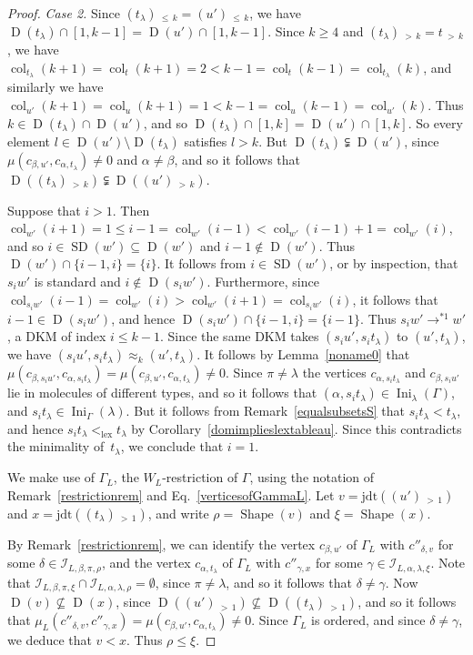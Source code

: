 \documentclass[ALCO,ThmDefs,Unicode,epreuves]{cedram}
\newenvironment{Case}[1]{\smallskip\noindent\emph{Case #1}\endgraf
 \nobreak\noindent\ignorespaces}{\endgraf\smallskip}
\DeclareMathOperator{\Ini}{Ini}
\DeclareMathOperator{\lex}{lex}
\DeclareMathOperator{\col}{col}
\newcommand{\morethan}[2]{#1\,{_{>\,#2}}}
\newcommand{\Lessthan}[2]{#1\,{_{\leqslant\,#2}}}
\newcommand{\jdt}{\mathrm{jdt}}
\DeclareMathOperator{\shape}{Shape}
\DeclareMathOperator{\SD}{SD}
\DeclareMathOperator{\D}{D}
\begin{document}
\begin{proof}
\begin{Case}{2. }
Since $\Lessthan {(t_\lambda)}{k}=\Lessthan {(u')}k$, we have
$\D(t_\lambda)\cap[1,k-1]=\D(u')\cap[1,k-1]$. Since $k\geqslant 4$ and
$\morethan{(t_\lambda)}k=\morethan tk$, we have
$\col_{t_\lambda}(k+1)=\col_t(k+1)=2<k-1=\col_t(k-1)=\col_{t_\lambda}(k)$, and similarly
we have $\col_{u'}(k+1)=\col_u(k+1)=1<k-1=\col_u(k-1)=\col_{u'}(k)$.
Thus $k\in\D(t_\lambda)\cap\D(u')$, and so
$\D(t_\lambda)\cap[1,k]=\D(u')\cap[1,k]$. So every element $l\in\D(u')\setminus\D(t_\lambda)$
satisfies $l>k$. But $\D(t_\lambda)\subsetneqq\D(u')$, since
$\mu(c_{\beta,u'},c_{\alpha,t_\lambda})\neq 0$ and $\alpha\ne\beta$, and so
it follows that
$\D(\morethan{(t_\lambda)}k)\subsetneqq\D(\morethan{(u')}k)$.

Suppose that $i>1$. Then
$\col_{w'}(i+1)=1\leqslant i-1=\col_{w'}(i-1)<\col_{w'}(i-1)+1=\col_{w'}(i)$,
and so $i\in\SD(w')\subseteq\D(w')$ and $i-1\notin\D(w')$. Thus
$\D(w')\cap\{i-1,i\}=\{i\}$. It follows from $i\in\SD(w')$, or
by inspection, that $s_iw'$ is standard and $i\notin\D(s_iw')$.
Furthermore, since $\col_{s_iw'}(i-1)=\col_{w'}(i)>\col_{w'}(i+1)=\col_{s_iw'}(i)$, it
follows that $i-1\in\D(s_iw')$, and hence $\D(s_iw')\cap\{i-1,i\}=\{i-1\}$.
Thus $s_iw'\to^{*1} w'$, a DKM of index $i\leqslant k-1$.
Since the same DKM
takes $(s_iu',s_it_\lambda)$ to $(u',t_\lambda)$, we have
$(s_iu',s_it_\lambda)\approx_k(u',t_\lambda)$. It follows by Lemma~\ref{noname0} that
$\mu(c_{\beta,s_iu'},c_{\alpha,s_it_\lambda})=\mu(c_{\beta,u'},c_{\alpha,t_\lambda})\neq 0$.
Since $\pi\ne\lambda$ the vertices $c_{\alpha,s_it_\lambda}$ and $c_{\beta,s_iu'}$
lie in molecules of different types, and so it follows that
$(\alpha,s_it_\lambda)\in\Ini_{\lambda}(\Gamma)$, and
$s_it_\lambda\in\Ini_\Gamma(\lambda)$. But it follows from
Remark~\ref{equalsubsetsS} that $s_it_\lambda<t_\lambda$, and hence
$s_it_\lambda<_{\lex} t_\lambda$ by Corollary~\ref{domimplieslextableau}.
Since this contradicts the minimality of~$t_\lambda$, we conclude that $i=1$.

We make use of $\Gamma_L$, the $W_L$-restriction of $\Gamma$,
using the notation of Remark~\ref{restrictionrem} and Eq.~\eqref{verticesofGammaL}.
Let $v=\jdt(\morethan{(u')}{1})$ and $x=\jdt(\morethan{(t_\lambda)}{1})$, and write
$\rho=\shape(v)$ and $\xi=\shape(x)$.

By Remark~\ref{restrictionrem}, we can identify the vertex $c_{\beta,u'}$ of
$\Gamma_L$ with $c''_{\delta,v}$ for some $\delta\in\mathcal{I}_{L,\beta,\pi,\rho}$, and
the vertex $c_{\alpha,t_\lambda}$ of $\Gamma_L$ with $c''_{\gamma,x}$ for some
$\gamma\in\mathcal{I}_{L,\alpha,\lambda,\xi}$. Note that
$\mathcal{I}_{L,\beta,\pi,\xi}\cap\mathcal{I}_{L,\alpha,\lambda,\rho}=\emptyset$, since
$\pi\neq\lambda$, and so it follows that $\delta\neq\gamma$.
Now $\D(v)\nsubseteq\D(x)$, since $\D(\morethan{(u')}{1})\nsubseteq\D(\morethan{(t_\lambda)}{1})$,
and so it follows that $\mu_L(c''_{\delta,v},c''_{\gamma,x})=\mu(c_{\beta,u'},c_{\alpha,t_\lambda})\neq 0$.
Since $\Gamma_L$ is ordered, and since
$\delta\neq\gamma$, we deduce that $v<x$. Thus $\rho\leqslant\xi$.


\end{Case}
\end{proof}
\end{document}
